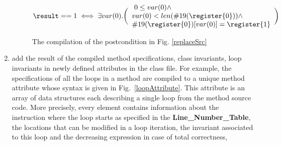 \begin{enumerate}
\begin{figure}[t]
 $$%
         \result == 1 %
         \iff %
         \exists  var(0) .
           \biggl(\begin{array}{l} \ 0 \leq var(0) \wedge\\ 
             var(0) < len(\#19(\register{0})) \wedge \\
             \#19(\register{0})[var(0)] = \register{1} 
         \end{array} \biggr) 
$$
\caption{\sc The compilation of the postcondition in Fig. \ref{replaceSrc}}
\label{postCompile}
\end{figure}





\item add the result of the compiled method specifications, class invariants, loop invariants in
newly defined attributes in the class file.
 For example, the specifications of all the loops in a method are compiled to a unique method attribute whose syntax is given in Fig.~\ref{loopAttribute}. This attribute is an array of data structures each describing a single loop from the method source code. 
More precisely, every element contains information about the instruction where the loop starts as specified in the
\textbf{Line\_Number\_Table}, the locations that can be modified in a loop iteration, 
 the invariant associated to this loop and the decreasing expression in case of total correctness, 
\end{enumerate}

